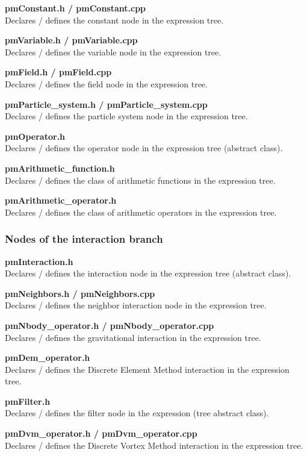\documentclass[a4paper,12pt,openany]{book}
\theoremstyle{break}
\begin{document}
\textbf{pmConstant.h / pmConstant.cpp} \\
Declares / defines the constant node in the expression tree.

\textbf{pmVariable.h / pmVariable.cpp} \\
Declares / defines the variable node in the expression tree.

\textbf{pmField.h / pmField.cpp} \\
Declares / defines the field node in the expression tree.

\textbf{pmParticle\_system.h / pmParticle\_system.cpp} \\
Declares / defines the particle system node in the expression tree.

\textbf{pmOperator.h} \\
Declares / defines the operator node in the expression tree (abstract class).

\textbf{pmArithmetic\_function.h} \\
Declares / defines the class of arithmetic functions in the expression tree.

\textbf{pmArithmetic\_operator.h} \\
Declares / defines the class of arithmetic operators in the expression tree.


\subsubsection{Nodes of the interaction branch}

\textbf{pmInteraction.h} \\
Declares / defines the interaction node in the expression tree (abstract class).

\textbf{pmNeighbors.h / pmNeighbors.cpp} \\
Declares / defines the neighbor interaction node in the expression tree.

\textbf{pmNbody\_operator.h / pmNbody\_operator.cpp} \\
Declares / defines the gravitational interaction in the expression tree.

\textbf{pmDem\_operator.h} \\
Declares / defines the Discrete Element Method interaction in the expression tree.

\textbf{pmFilter.h} \\
Declares / defines the filter node in the expression (tree abstract class).

\textbf{pmDvm\_operator.h / pmDvm\_operator.cpp} \\
Declares / defines the Discrete Vortex Method interaction in the expression tree.
\end{document}
